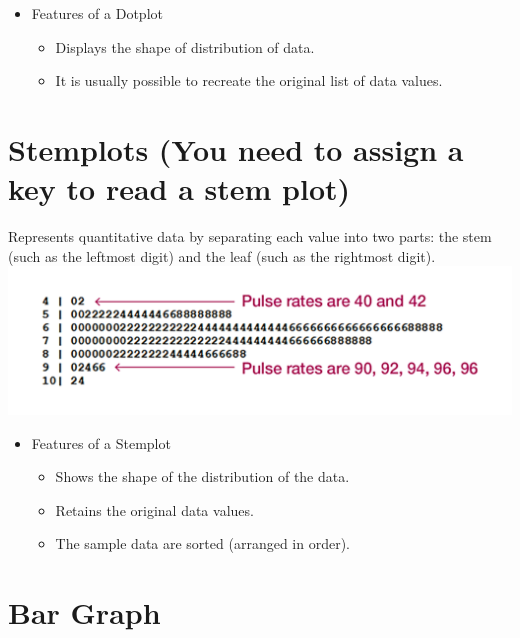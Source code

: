 \documentclass[]{book}
\providecommand{\tightlist}{%
  \setlength{\itemsep}{0pt}\setlength{\parskip}{0pt}}
\begin{document}
\begin{itemize}
\tightlist
\item
  Features of a Dotplot

  \begin{itemize}
  \tightlist
  \item
    Displays the shape of distribution of data.
  \item
    It is usually possible to recreate the original list of data values.
  \end{itemize}
\end{itemize}

\hypertarget{stemplots-you-need-to-assign-a-key-to-read-a-stem-plot}{%
\section{Stemplots (You need to assign a key to read a stem plot)}\label{stemplots-you-need-to-assign-a-key-to-read-a-stem-plot}}

Represents quantitative data by separating each value into two parts: the stem (such as the leftmost digit) and the leaf (such as the rightmost digit).
\includegraphics{stem.png}

\begin{itemize}
\tightlist
\item
  Features of a Stemplot

  \begin{itemize}
  \tightlist
  \item
    Shows the shape of the distribution of the data.
  \item
    Retains the original data values.
  \item
    The sample data are sorted (arranged in order).
  \end{itemize}
\end{itemize}

\hypertarget{bar-graph}{%
\section{Bar Graph}\label{bar-graph}}
\end{document}
